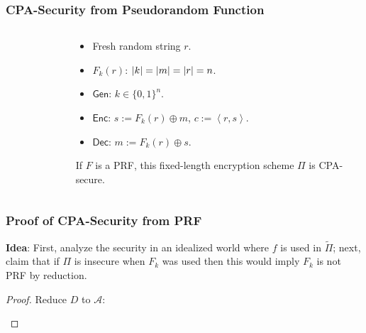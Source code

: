 \begin{frame}\frametitle{CPA-Security from Pseudorandom Function}
\begin{columns}[t]
\begin{column}{4cm}
\begin{figure}
\begin{center}

\end{center}
\end{figure}
\end{column}
\begin{column}{6cm}
\begin{construction}\label{con:cpa}
\begin{itemize}
\item Fresh random string $r$.
\item $F_k(r)$: $\lvert k\rvert = \lvert m\rvert = \lvert r\rvert = n$.
\item $\mathsf{Gen}$: $k \in \{0,1\}^n$.
\item $\mathsf{Enc}$: $s := F_k(r)\oplus m$, $c := \left<r, s\right>$.
\item $\mathsf{Dec}$: $m := F_k(r)\oplus s$.
\end{itemize}
\end{construction}
\begin{theorem}\label{thm:prf}
If $F$ is a PRF, this fixed-length encryption scheme $\Pi$ is CPA-secure.
\end{theorem}
\end{column}
\end{columns}
\end{frame}
\begin{frame}\frametitle{Proof of CPA-Security from PRF}
\textbf{Idea}: First, analyze the security in an idealized world where $f$ is used in $\tilde{\Pi}$; next, claim that if $\Pi$ is insecure when $F_k$ was used then this would imply $F_k$ is not PRF by reduction.
\begin{proof}
Reduce $D$ to $\mathcal{A}$:
\begin{figure}
\begin{center}

\end{center}
\end{figure}
\end{proof}
\end{frame}
